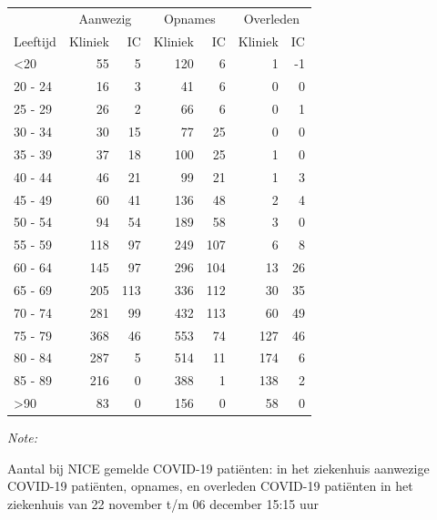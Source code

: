 \documentclass[
  english,
  man,floatsintext]{apa6}
\begin{document}
\begin{table}
\centering\begingroup\fontsize{10}{12}\selectfont

\begin{threeparttable}
\begin{tabular}{lrrrrrr}
\toprule
\multicolumn{1}{c}{ } & \multicolumn{2}{c}{Aanwezig} & \multicolumn{2}{c}{Opnames} & \multicolumn{2}{c}{Overleden} \\
\cmidrule(l{3pt}r{3pt}){2-3} \cmidrule(l{3pt}r{3pt}){4-5} \cmidrule(l{3pt}r{3pt}){6-7}
Leeftijd & Kliniek & IC & Kliniek & IC & Kliniek & IC\\
\midrule
<20 & 55 & 5 & 120 & 6 & 1 & -1\\
20 - 24 & 16 & 3 & 41 & 6 & 0 & 0\\
25 - 29 & 26 & 2 & 66 & 6 & 0 & 1\\
30 - 34 & 30 & 15 & 77 & 25 & 0 & 0\\
35 - 39 & 37 & 18 & 100 & 25 & 1 & 0\\
40 - 44 & 46 & 21 & 99 & 21 & 1 & 3\\
45 - 49 & 60 & 41 & 136 & 48 & 2 & 4\\
50 - 54 & 94 & 54 & 189 & 58 & 3 & 0\\
55 - 59 & 118 & 97 & 249 & 107 & 6 & 8\\
60 - 64 & 145 & 97 & 296 & 104 & 13 & 26\\
65 - 69 & 205 & 113 & 336 & 112 & 30 & 35\\
70 - 74 & 281 & 99 & 432 & 113 & 60 & 49\\
75 - 79 & 368 & 46 & 553 & 74 & 127 & 46\\
80 - 84 & 287 & 5 & 514 & 11 & 174 & 6\\
85 - 89 & 216 & 0 & 388 & 1 & 138 & 2\\
>90 & 83 & 0 & 156 & 0 & 58 & 0\\
\bottomrule
\end{tabular}
\begin{tablenotes}
\item \textit{Note: } 
\item Aantal bij NICE gemelde COVID-19 patiënten: in het ziekenhuis aanwezige COVID-19 patiënten, opnames, en overleden COVID-19 patiënten in het ziekenhuis van 22 november t/m 06 december 15:15 uur
\end{tablenotes}
\end{threeparttable}
\endgroup{}
\end{table}

\newpage
\end{document}
